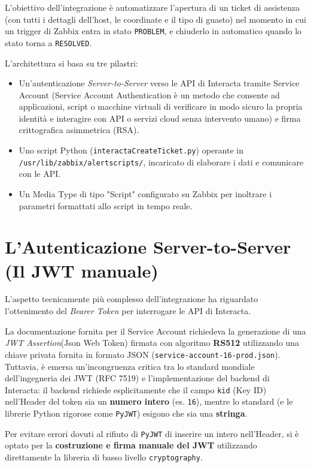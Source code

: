 \documentclass[12pt, a4paper]{report}
\begin{document}
L'obiettivo dell'integrazione è automatizzare l'apertura di un ticket di assistenza
(con tutti i dettagli dell'host, le coordinate e il tipo di guasto) 
nel momento in cui un trigger di Zabbix entra in stato \texttt{PROBLEM}, 
e chiuderlo in automatico quando lo stato torna a \texttt{RESOLVED}.

L'architettura si basa su tre pilastri:
\begin{itemize}
    \item Un'autenticazione \textit{Server-to-Server} verso le API di Interacta tramite Service Account 
    (Service Account Authentication è un metodo che consente ad applicazioni, script o macchine virtuali
    di verificare in modo sicuro la propria identità e interagire con API o servizi cloud senza intervento umano) e
    firma crittografica asimmetrica (RSA).
    \item Uno script Python (\texttt{interactaCreateTicket.py}) operante in 
    \\\texttt{/usr/lib/zabbix/alertscripts/}, incaricato di elaborare i dati e comunicare con le API.
    \item Un Media Type di tipo "Script" configurato su Zabbix per inoltrare i parametri 
    formattati allo script in tempo reale.
\end{itemize}

\section{L'Autenticazione Server-to-Server (Il JWT manuale)}
L'aspetto tecnicamente più complesso dell'integrazione ha riguardato l'ottenimento 
del \textit{Bearer Token} per interrogare le API di Interacta.

La documentazione fornita per il Service Account richiedeva la generazione di una \textit{JWT Assertion}(Json Web Token) 
firmata con algoritmo \textbf{RS512} utilizzando una chiave privata fornita in formato JSON (\texttt{service-account-16-prod.json}). 
Tuttavia, è emersa un'incongruenza critica tra lo standard mondiale dell'ingegneria dei JWT (RFC 7519) 
e l'implementazione del backend di Interacta: il backend richiede esplicitamente che il campo
\texttt{kid} (Key ID) nell'Header del token sia un \textbf{numero intero} 
(es. \texttt{16}), mentre lo standard (e le librerie Python rigorose come \texttt{PyJWT}) esigono che sia una \textbf{stringa}.

Per evitare errori dovuti al rifiuto di \texttt{PyJWT} di inserire un intero nell'Header, 
si è optato per la \textbf{costruzione e firma manuale del JWT} 
utilizzando direttamente la libreria di basso livello \texttt{cryptography}.
\end{document}
